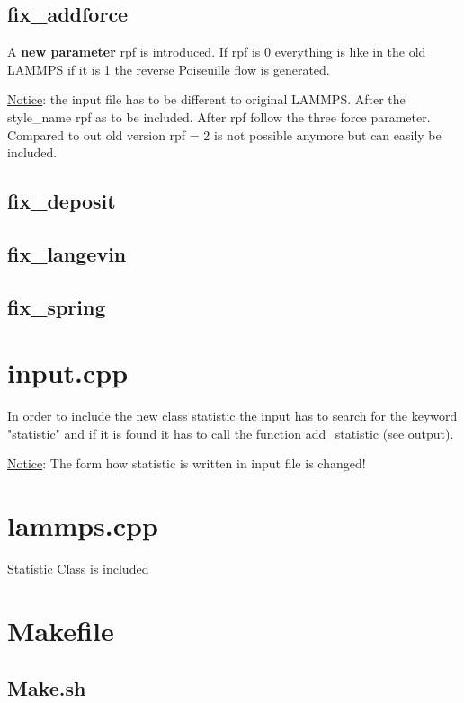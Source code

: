 \documentclass[a4paper,10pt]{scrreprt}
\begin{document}
\subsection{fix\_addforce}

A \textbf{new parameter} rpf is introduced.
If rpf is 0 everything is like in the old LAMMPS if it is 1 the reverse Poiseuille flow is generated.

\underline{Notice}: the input file has to be different to original LAMMPS.
After the style\_name rpf as to be included. After rpf follow the three force parameter.
Compared to out old version rpf = 2 is not possible anymore but can easily be included.


\subsection{fix\_deposit}


\subsection{fix\_langevin}


\subsection{fix\_spring}


\section{input.cpp}

In order to include the new class statistic the input has to search for the  keyword "statistic" and if it is found it has to call the function add\_statistic (see output).

\underline{Notice}: The form how statistic is written in input file is changed!


\section{lammps.cpp}

Statistic Class is included


\section{Makefile}


\subsection{Make.sh}
\end{document}
